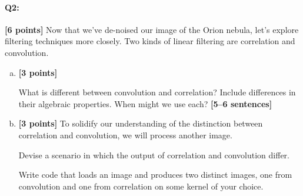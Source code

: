 \documentclass[11pt]{article}
\begin{document}

\pagebreak
\paragraph{Q2:} \textbf{[6 points]} Now that we've de-noised our image of the Orion nebula, let's explore filtering techniques more closely. Two kinds of linear filtering are correlation and convolution.

\begin{enumerate}[(a)]

    \item \textbf{[3 points]} 
    \begin{tcolorbox}[colback=orange!5!white,colframe=orange!75!black]
    What is different between convolution and correlation? Include differences in their algebraic properties. When might we use each? \textbf{[5--6 sentences]}
    \end{tcolorbox}
    

    
    \item \textbf{[3 points]}
    To solidify our understanding of the distinction between correlation and convolution, we will process another image.
    
    \begin{tcolorbox}[colback=orange!5!white,colframe=orange!75!black]
    Devise a scenario in which the output of correlation and convolution differ.
    
    Write code that loads an image and produces two distinct images, one from convolution and one from correlation on some kernel of your choice. 
    

\end{tcolorbox}
\end{enumerate}
\end{document}
